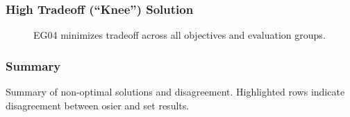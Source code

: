 \begin{frame}
  \frametitle{High Tradeoff (``Knee'') Solution}
        
  \begin{figure}[htbp!]
    \begin{center}
      \resizebox{0.8\columnwidth}{!}{}
    \end{center}
          \caption{EG04 minimizes tradeoff across all objectives and evaluation groups.}
    \label{fig:single-eg-pcp}
  \end{figure}
\end{frame}

        


\begin{frame}
  \frametitle{Summary}
    \begin{table}
        \centering
        \caption{Summary of non-optimal solutions and disagreement. Highlighted rows indicate disagreement between \Gls{osier} and \Gls{set} results.}
        \label{tab:non-optimal-subset}
        \resizebox{0.8\columnwidth}{!}{}
    \end{table}
\end{frame}

  
